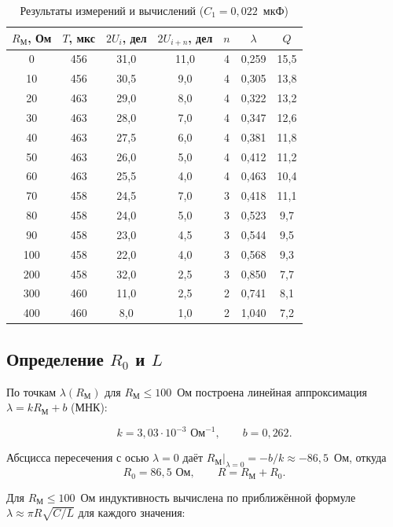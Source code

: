 \begin{table}[H]
\centering
\caption{Результаты измерений и вычислений ($C_1 = 0{,}022$~мкФ)}
\small
\begin{tabular}{|c|c|c|c|c|c|c|}
\hline
$R_\text{М}$, Ом & $T$, мкс & $2U_i$, дел & $2U_{i+n}$, дел & $n$ & $\lambda$ & $Q$ \\
\hline
0   & 456 & 31,0 & 11,0 & 4 & 0,259 & 15,5 \\
10  & 456 & 30,5 & 9,0  & 4 & 0,305 & 13,8 \\
20  & 463 & 29,0 & 8,0  & 4 & 0,322 & 13,2 \\
30  & 463 & 28,0 & 7,0  & 4 & 0,347 & 12,6 \\
40  & 463 & 27,5 & 6,0  & 4 & 0,381 & 11,8 \\
50  & 463 & 26,0 & 5,0  & 4 & 0,412 & 11,2 \\
60  & 463 & 25,5 & 4,0  & 4 & 0,463 & 10,4 \\
70  & 458 & 24,5 & 7,0  & 3 & 0,418 & 11,1 \\
80  & 458 & 24,0 & 5,0  & 3 & 0,523 & 9,7 \\
90  & 458 & 23,0 & 4,5  & 3 & 0,544 & 9,5 \\
100 & 458 & 22,0 & 4,0  & 3 & 0,568 & 9,3 \\
200 & 458 & 32,0 & 2,5  & 3 & 0,850 & 7,7 \\
300 & 460 & 11,0 & 2,5  & 2 & 0,741 & 8,1 \\
400 & 460 & 8,0  & 1,0  & 2 & 1,040 & 7,2 \\
\hline
\end{tabular}
\normalsize
\end{table}

\subsection{Определение $R_0$ и $L$}

По точкам $\lambda(R_\text{М})$ для $R_\text{М} \leq 100$~Ом построена линейная аппроксимация $\lambda = k R_\text{М} + b$ (МНК):

\[
k = 3{,}03 \cdot 10^{-3} \text{ Ом}^{-1}, \qquad b = 0{,}262.
\]

Абсцисса пересечения с осью $\lambda = 0$ даёт $R_\text{М}|_{\lambda=0} = -b/k \approx -86{,}5$~Ом, откуда
\[
R_0 = 86{,}5 \text{ Ом}, \qquad R = R_\text{М} + R_0.
\]

Для $R_\text{М} \leq 100$~Ом индуктивность вычислена по приближённой формуле $\lambda \approx \pi R\sqrt{C/L}$ для каждого значения:

